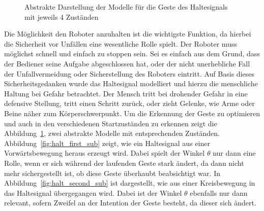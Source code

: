 \begin{figure}[htb]
{
        \label{fig:halt_second_sub}
    }
  
    \caption{Abstrakte Darstellung der Modelle f\"ur die Geste des Haltesignals mit jeweils 4 Zust\"anden}
    \label{fig:halt_ideal}
\end{figure}

Die M\"oglichkeit den Roboter anzuhalten ist die wichtigste Funktion, da hierbei die Sicherheit vor Unf\"allen eine wesentliche Rolle spielt. Der Roboter muss m\"oglichst schnell und einfach zu stoppen sein. Sei es einfach aus dem Grund, dass der Bediener seine Aufgabe abgeschlossen hat, oder der nicht unerhebliche Fall der Unfallvermeidung oder Sicherstellung des Roboters eintritt.
\newline
Auf Basis dieses Sicherheitsgedanken wurde das Haltesignal modelliert und hierzu die menschliche Haltung bei Gefahr betrachtet. Der Mensch tritt bei drohender Gefahr in eine defensive Stellung, tritt einen Schritt zur\"uck, oder zieht Gelenke, wie Arme oder Beine n\"aher zum K\"orperschwerpunkt.
\newline
Um die Erkennung der Geste zu optimieren und auch in den verschiedenen Startzust\"anden zu erkennen zeigt die Abbildung~\ref{fig:halt_ideal}, zwei abstrakte Modelle mit entsprechenden Zust\"anden. 
\newline
Abbildung~\ref{fig:halt_first_sub} zeigt, wie ein Haltesignal aus einer Vorw\"artsbewegung heraus erzeugt wird. Dabei spielt der Winkel $\theta$ nur dann eine Rolle, wenn er sich w\"ahrend der laufenden Geste stark \"andert, da dann nicht mehr sichergestellt ist, ob diese Geste \"uberhaubt beabsichtigt war.
\newline
In Abbildung~\ref{fig:halt_second_sub} ist dargestellt, wie aus einer Kreisbewegung in das Haltesignal \"ubergegangen wird. Dabei ist der Winkel $\theta$ ebenfalls nur dann relevant, sofern Zweifel an der Intention der Geste besteht, da dieser sich \"andert.


